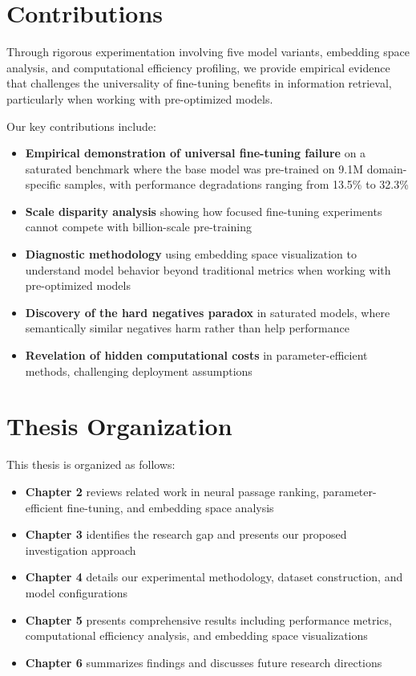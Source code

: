 \section{Contributions}

Through rigorous experimentation involving five model variants, embedding space analysis, and computational efficiency profiling, we provide empirical evidence that challenges the universality of fine-tuning benefits in information retrieval, particularly when working with pre-optimized models.

Our key contributions include:

\begin{itemize}
\item \textbf{Empirical demonstration of universal fine-tuning failure} on a saturated benchmark where the base model was pre-trained on 9.1M domain-specific samples, with performance degradations ranging from 13.5\% to 32.3\%
\item \textbf{Scale disparity analysis} showing how focused fine-tuning experiments cannot compete with billion-scale pre-training
\item \textbf{Diagnostic methodology} using embedding space visualization to understand model behavior beyond traditional metrics when working with pre-optimized models
\item \textbf{Discovery of the hard negatives paradox} in saturated models, where semantically similar negatives harm rather than help performance
\item \textbf{Revelation of hidden computational costs} in parameter-efficient methods, challenging deployment assumptions
\end{itemize}

\section{Thesis Organization}

This thesis is organized as follows:

\begin{itemize}
\item \textbf{Chapter 2} reviews related work in neural passage ranking, parameter-efficient fine-tuning, and embedding space analysis
\item \textbf{Chapter 3} identifies the research gap and presents our proposed investigation approach
\item \textbf{Chapter 4} details our experimental methodology, dataset construction, and model configurations
\item \textbf{Chapter 5} presents comprehensive results including performance metrics, computational efficiency analysis, and embedding space visualizations
\item \textbf{Chapter 6} summarizes findings and discusses future research directions
\end{itemize}